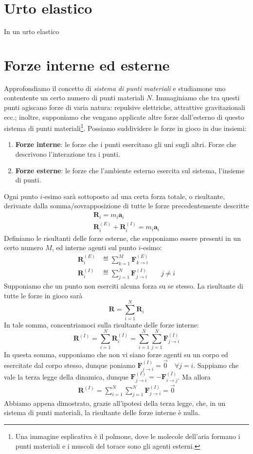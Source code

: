 \section{Urto elastico}
In un urto elastico

\section{Forze interne ed esterne}
Approfondiamo il concetto di \textit{sistema di punti materiali} e studiamone
uno contentente un certo numero di punti materiali $N$. Immaginiamo che
tra questi punti agiscano forze di varia natura: repulsive elettriche,
attrattive gravitazionali ecc.; inoltre, supponiamo che vengano applicate
altre forze dall'esterno di questo sistema di punti materiali\footnote{Una
immagine esplicativa è il polmone, dove le molecole dell'aria formano i
punti materiali e i muscoli del torace sono gli agenti esterni.}.
Possiamo suddividere le forze in gioco in due insiemi:
\begin{enumerate}
    \item \textbf{Forze interne}: le forze che i punti esercitano gli uni
    sugli altri. Forze che descrivono l'interazione tra i punti.
    \item \textbf{Forze esterne}: le forze che l'ambiente esterno esercita
    sul sistema, l'insieme di punti.
\end{enumerate}
Ogni punto $i$-esimo sarà sottoposto ad una certa forza totale, o risultante, derivante
dalla somma/sovrapposizione di tutte le forze precedentemente descritte
\begin{align*}
    \mathbf{R}_i = m_i\mathbf{a}_i\\
    \mathbf{R}^{(E)}_i + \mathbf{R}^{(I)}_i = m_i\mathbf{a}_i
\end{align*}
Definiamo le risultanti delle forze esterne, che supponiamo essere presenti
in un certo numero $M$, ed interne agenti sul punto
$i$-esimo:
\begin{align*}
    \mathbf{R}^{(E)}_i &\eqdef \sum_{k = 1}^{M} \mathbf{F}^{(E)}_{k \to i}\\
    \mathbf{R}^{(I)}_i &\eqdef \sum_{j = 1}^{N} \mathbf{F}^{(I)}_{j \to i} \qquad j \not = i
\end{align*}
Supponiamo che un punto non eserciti alcuna forza su se stesso.
La risultante di tutte le forze in gioco sarà
\[ \mathbf{R} = \sum_{i = 1}^{N} \mathbf{R}_i \]
In tale somma, concentriamoci sulla risultante delle forze interne:
\[ \mathbf{R}^{(I)} = \sum_{i = 1}^{N} \mathbf{R}^{(I)}_i = \sum_{i = 1}^{N} \sum_{j = 1}^{N} \mathbf{F}^{(I)}_{j \to i} \]
In questa somma, supponiamo che non vi siano forze agenti su un corpo
ed esercitate dal corpo stesso, dunque poniamo $\mathbf{F}^{(I)}_{j \to i} = \overrightarrow{0} \quad \forall j = i$.
Sappiamo che vale la terza legge della dinamica, dunque
$\mathbf{F}^{(I)}_{j \to i} = -\mathbf{F}^{(I)}_{i \to j}$. Ma allora
\begin{align}
    \mathbf{R}^{(I)} = \sum_{i = 1}^{N} \sum_{j = 1}^{N} \mathbf{F}^{(I)}_{j \to i} = \overrightarrow{0}\label{interne}
\end{align}
Abbiamo appena dimostrato, grazie all'ipotesi della terza legge,
che, in un sistema di punti materiali, la risultante delle forze interne
è nulla.

